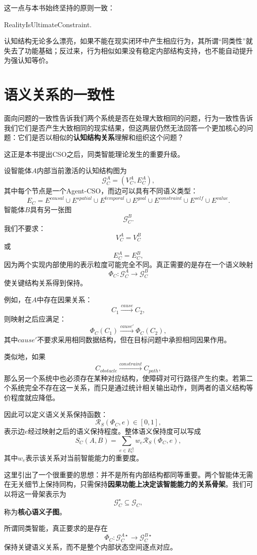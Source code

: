 这一点与本书始终坚持的原则一致：
\begin{statementbox}
RealityIsUltimateConstraint.
\end{statementbox}
认知结构无论多么漂亮，如果不能在现实闭环中产生相应行为，其所谓``同类性''就失去了功能基础；反过来，行为相似如果没有稳定内部结构支持，也不能自动提升为强认知等价。

\section{语义关系的一致性}

面向问题的一致性告诉我们两个系统是否在处理大致相同的问题，行为一致性告诉我们它们是否产生大致相同的现实结果，但这两层仍然无法回答一个更加核心的问题：它们是否以相似的\textbf{认知结构关系}理解和组织这个问题？

这正是本书提出CSO之后，同类智能理论发生的重要升级。

设智能体$A$内部当前激活的认知结构图为
\[
\mathcal G_C^A
=
(V_C^A,E_C^A),
\]
其中每个节点是一个Agent-CSO，而边可以具有不同语义类型：
\[
E_C
=
E^{causal}
\cup
E^{spatial}
\cup
E^{temporal}
\cup
E^{goal}
\cup
E^{constraint}
\cup
E^{self}
\cup
E^{value}.
\]
智能体$B$具有另一张图
\[
\mathcal G_C^B.
\]
我们不要求：
\[
V_C^A=V_C^B
\]
或
\[
E_C^A=E_C^B,
\]
因为两个实现内部使用的表示粒度可能完全不同。真正需要的是存在一个语义映射
\[
\Phi_C:
\mathcal G_C^A
\rightarrow
\mathcal G_C^B
\]
使关键结构关系得到保持。

例如，在$A$中存在因果关系：
\[
C_1
\xrightarrow{cause}
C_2,
\]
则映射之后应满足：
\[
\Phi_C(C_1)
\xrightarrow{cause'}
\Phi_C(C_2),
\]
其中$cause'$不要求采用相同数据结构，但在目标问题中承担相同因果作用。

类似地，如果
\[
C_{obstacle}
\xrightarrow{constraint}
C_{path},
\]
那么另一个系统中也必须存在某种对应结构，使障碍对可行路径产生约束。若第二个系统完全不存在这一关系，而只是通过统计相关输出动作，则两者的语义结构等价程度就应降低。

因此可以定义语义关系保持函数：
\[
\mathcal R_S
(\Phi_C,e)
\in[0,1],
\]
表示边$e$经过映射之后的语义保持程度。整体语义保持度可以写成
\[
S_C(A,B)
=
\sum_{e\in E_C^A}
w_e
\mathcal R_S
(\Phi_C,e),
\]
其中$w_e$表示该关系对当前智能能力的重要度。

这里引出了一个很重要的思想：并不是所有内部结构都同等重要。两个智能体无需在无关细节上保持同构，只需保持\textbf{因果功能上决定该智能能力的关系骨架}。我们可以将这一骨架表示为
\[
\mathcal G_C^\star
\subseteq
\mathcal G_C,
\]
称为\textbf{核心语义子图}。

所谓同类智能，真正要求的是存在
\[
\Phi_C:
\mathcal G_C^{A\star}
\rightarrow
\mathcal G_C^{B\star}
\]
保持关键语义关系，而不是整个内部状态空间逐点对应。

